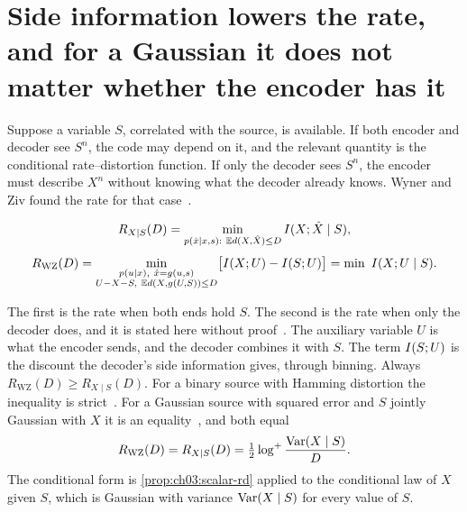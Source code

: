 

\section{Side information lowers the rate, and for a Gaussian it does not matter whether the encoder has it}\label{sec:ch03:side}

Suppose a variable $S$, correlated with the source, is available. If both encoder and decoder see $S^n$, the code may depend on it, and the relevant quantity is the conditional rate--distortion function. If only the decoder sees $S^n$, the encoder must describe $X^n$ without knowing what the decoder already knows. Wyner and Ziv found the rate for that case~\cite{wynerziv1976}.

\begin{definition}\label{def:ch03:wz}
\begin{equation}\label{eq:ch03:cond-rd}
R_{X\mid S}(D)=\min_{p(\hat x\mid x,s):\ \mathbb{E} d(X,\hat X)\le D}I(X;\hat X\mid S),
\end{equation}
\begin{equation}\label{eq:ch03:wz}
R_{\mathrm{WZ}}(D)=\min_{\substack{p(u\mid x),\ \hat x=g(u,s)\\ U-X-S,\ \E d(X,g(U,S))\le D}}\bigl[\MI{X}{U}-\MI{S}{U}\bigr]
=\min\ \MI{X}{U\mid S}.
\end{equation}
\end{definition}

The first is the rate when both ends hold $S$. The second is the rate when only the decoder does, and it is stated here without proof~\cite{wynerziv1976}. The auxiliary variable $U$ is what the encoder sends, and the decoder combines it with $S$. The term $I(S;U)$ is the discount the decoder's side information gives, through binning. Always $R_{\mathrm{WZ}}(D)\ge R_{X\mid S}(D)$. For a binary source with Hamming distortion the inequality is strict~\cite{wynerziv1976}. For a Gaussian source with squared error and $S$ jointly Gaussian with $X$ it is an equality~\cite{wyner1978}, and both equal
\begin{equation}\label{eq:ch03:wz-gauss}
R_{\mathrm{WZ}}(D)=R_{X\mid S}(D)=\tfrac12\log^{+}\frac{\operatorname{Var}(X\mid S)}{D}.
\end{equation}
The conditional form is \cref{prop:ch03:scalar-rd} applied to the conditional law of $X$ given $S$, which is Gaussian with variance $\operatorname{Var}(X\mid S)$ for every value of $S$.

